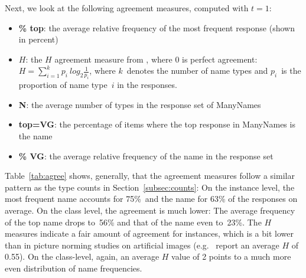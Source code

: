 Next, we look at the following agreement measures, computed with $t=1$: %
\begin{itemize}
\setlength{\itemsep}{0pt}
\setlength{\parskip}{0pt}
\item \textbf{\% top}: the average relative frequency of the most frequent response (shown in percent)
\item \textbf{$H$}: the $H$ agreement measure from \citet{snodgrass}, where 0 is perfect agreement: \mbox{$H = \sum_{i=1}^k p_i~log_2\frac{1}{p_i}$}, 
where $k$\ denotes the number of name types and $p_i$\ is the proportion of name type\ $i$ in the responses.%
\item \textbf{N}: the average number of types in the response set of ManyNames
\item \textbf{top=VG}: the percentage of items where the top response in ManyNames is the \vg name 
\item \textbf{\% VG}: the average relative frequency of the \vg name in the response set 
\end{itemize}


Table\ \ref{tab:agree} shows, generally, that the agreement measures follow a similar pattern as the type counts in Section\ \ref{subsec:counts}:
On the instance level, %
the most frequent name accounts for 75\%\  and the \vg name for 63\% of the responses on average. On the class level, the agreement is much lower: The average frequency of the top name drops to\ 56\% and that of the \vg name even to\ 23\%. The $H$ measures indicate a fair amount of agreement for instances, which is a bit lower than in picture norming studies on artificial images (e.g.\  report an average $H$ of 0.55). On the class-level, again, an average $H$ value of 2 points to a much more even distribution of name frequencies.

